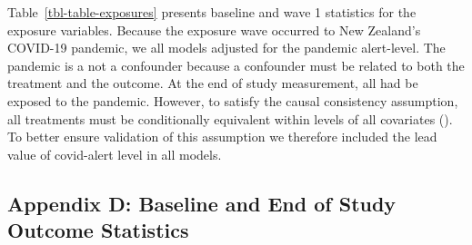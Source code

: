 \documentclass[
  singlecolumn]{article}
\begin{document}
Table~\ref{tbl-table-exposures} presents baseline and wave 1 statistics
for the exposure variables. Because the exposure wave occurred to New
Zealand's COVID-19 pandemic, we all models adjusted for the pandemic
alert-level. The pandemic is a not a confounder because a confounder
must be related to both the treatment and the outcome. At the end of
study measurement, all had be exposed to the pandemic. However, to
satisfy the causal consistency assumption, all treatments must be
conditionally equivalent within levels of all covariates
(). To better
ensure validation of this assumption we therefore included the lead
value of covid-alert level in all models.

\subsection{Appendix D: Baseline and End of Study Outcome
Statistics}\label{appendix-outcomes}
\end{document}
